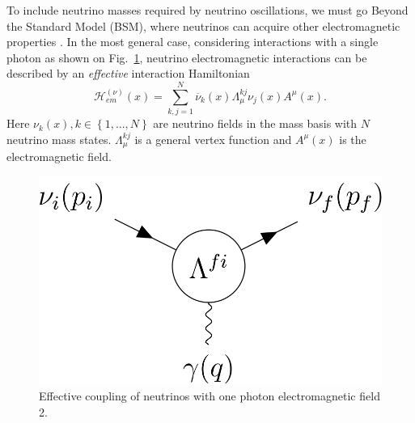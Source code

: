 To include neutrino masses required by neutrino oscillations, we must go Beyond the Standard Model (BSM), where neutrinos can acquire other electromagnetic properties \cite{nuElmagInt2015.pdf}. In the most general case, considering interactions with a single photon as shown on Fig.~\ref{fig:FeynmanNuElmagDiagram}, neutrino electromagnetic interactions can be described by an \textit{effective} interaction Hamiltonian \cite{nuElmagInt2015.pdf}
\begin{equation}
\mathcal{H}^{\left(\nu\right)}_{em}\left(x\right)=\sum^N_{k,j=1}\overline{\nu}_k\left(x\right)\Lambda^{kj}_{\mu}\nu_j\left(x\right)A^{\mu}\left(x\right).
\end{equation}
Here $\nu_k\left(x\right), k\in\left\lbrace 1,...,N\right\rbrace$ are neutrino fields in the mass basis with $N$ neutrino mass states. $\Lambda^{kj}_{\mu}$ is a general vertex function and $A^{\mu}\left(x\right)$ is the electromagnetic field.

\begin{figure}[hbtp]
\centering
\includegraphics[width=0.4\linewidth]{Plots/NuMM/FeynmanDiagramNuElmagInt.png}
\caption{Effective coupling of neutrinos with one photon electromagnetic field 2.}
\label{fig:FeynmanNuElmagDiagram}
\end{figure}

